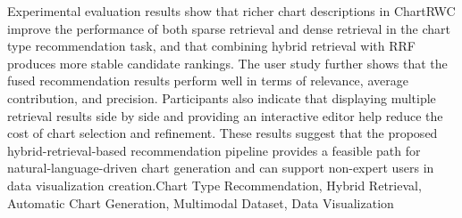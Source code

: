 \documentclass{ZJUTbachelor}
\begin{document}
{	Experimental evaluation results show that richer chart descriptions in ChartRWC improve the performance of both sparse retrieval and dense retrieval in the chart type recommendation task, and that combining hybrid retrieval with RRF produces more stable candidate rankings. The user study further shows that the fused recommendation results perform well in terms of relevance, average contribution, and precision. Participants also indicate that displaying multiple retrieval results side by side and providing an interactive editor help reduce the cost of chart selection and refinement. These results suggest that the proposed hybrid-retrieval-based recommendation pipeline provides a feasible path for natural-language-driven chart generation and can support non-expert users in data visualization creation.}{Chart Type Recommendation, Hybrid Retrieval, Automatic Chart Generation, Multimodal Dataset, Data Visualization}





	\makeTOCandLOTandLOF
	\setcounter{page}{0}
	\newpage


	
	
	
	
	
	
	
	

	\clearpage
	\begingroup
	
	
	\endgroup



	\makeAcknowledge{}





\end{document}
